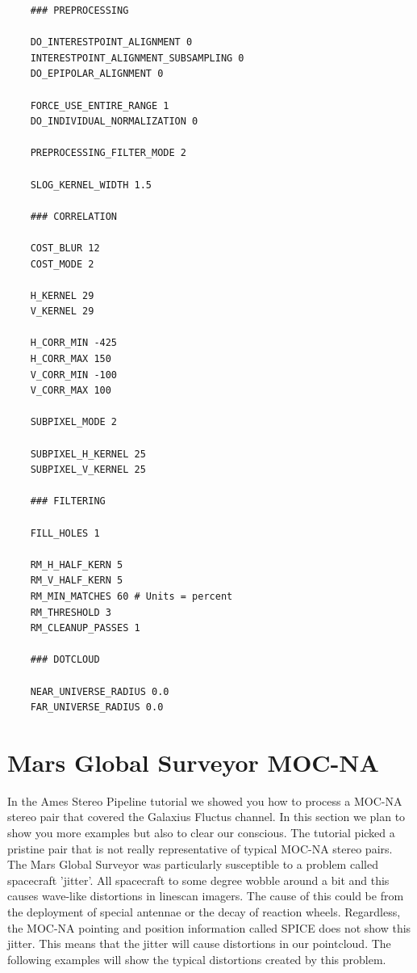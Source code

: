 \begin{verbatim}
    ### PREPROCESSING

    DO_INTERESTPOINT_ALIGNMENT 0
    INTERESTPOINT_ALIGNMENT_SUBSAMPLING 0
    DO_EPIPOLAR_ALIGNMENT 0

    FORCE_USE_ENTIRE_RANGE 1
    DO_INDIVIDUAL_NORMALIZATION 0

    PREPROCESSING_FILTER_MODE 2

    SLOG_KERNEL_WIDTH 1.5

    ### CORRELATION

    COST_BLUR 12
    COST_MODE 2

    H_KERNEL 29
    V_KERNEL 29

    H_CORR_MIN -425
    H_CORR_MAX 150
    V_CORR_MIN -100
    V_CORR_MAX 100

    SUBPIXEL_MODE 2

    SUBPIXEL_H_KERNEL 25
    SUBPIXEL_V_KERNEL 25

    ### FILTERING

    FILL_HOLES 1

    RM_H_HALF_KERN 5
    RM_V_HALF_KERN 5
    RM_MIN_MATCHES 60 # Units = percent
    RM_THRESHOLD 3
    RM_CLEANUP_PASSES 1

    ### DOTCLOUD

    NEAR_UNIVERSE_RADIUS 0.0
    FAR_UNIVERSE_RADIUS 0.0
\end{verbatim}

\section{Mars Global Surveyor MOC-NA}

In the Ames Stereo Pipeline tutorial we showed you how to process a
MOC-NA stereo pair that covered the Galaxius Fluctus channel. In this
section we plan to show you more examples but also to clear our
conscious. The tutorial picked a pristine pair that is not really
representative of typical MOC-NA stereo pairs. The Mars Global
Surveyor was particularly susceptible to a problem called spacecraft
'jitter'. All spacecraft to some degree wobble around a bit and this
causes wave-like distortions in linescan imagers. The cause of this
could be from the deployment of special antennae or the decay of
reaction wheels. Regardless, the MOC-NA pointing and position
information called SPICE does not show this jitter. This means that
the jitter will cause distortions in our pointcloud. The following
examples will show the typical distortions created by this problem.

